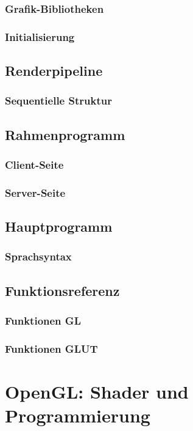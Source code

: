 \documentclass{scrreprt}
\begin{document}
\subsection{Grafik-Bibliotheken}
\subsection{Initialisierung}

\section{Renderpipeline}
\subsection{Sequentielle Struktur}
\section{Rahmenprogramm}
\subsection{Client-Seite}
\subsection{Server-Seite}

\section{Hauptprogramm}
\subsection{Sprachsyntax}

\section{Funktionsreferenz}
\subsection{Funktionen GL}
\subsection{Funktionen GLUT}

\chapter{OpenGL: Shader und Programmierung}
\end{document}
